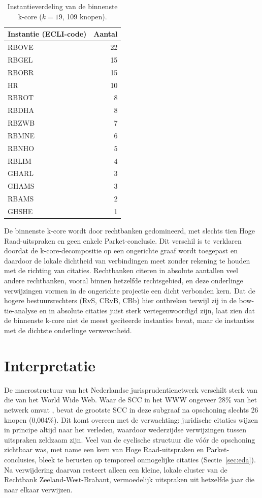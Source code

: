 \documentclass[a4paper, 12pt]{report}
\begin{document}
\begin{table}[H]
  \centering
  \caption{Instantieverdeling van de binnenste k-core ($k=19$, 109 knopen).}
  \label{tab:dv1-kcore-instanties}
  \begin{tabular}{lr}
    \toprule
    Instantie (ECLI-code) & Aantal \\
    \midrule
    RBOVE & 22 \\
    RBGEL & 15 \\
    RBOBR & 15 \\
    HR    & 10 \\
    RBROT & 8 \\
    RBDHA & 8 \\
    RBZWB & 7 \\
    RBMNE & 6 \\
    RBNHO & 5 \\
    RBLIM & 4 \\
    GHARL & 3 \\
    GHAMS & 3 \\
    RBAMS & 2 \\
    GHSHE & 1 \\
    \bottomrule
  \end{tabular}
\end{table}

De binnenste k-core wordt door rechtbanken gedomineerd, met slechts tien Hoge Raad-uitspraken en geen enkele Parket-conclusie. Dit verschil is te verklaren doordat de k-core-decompositie op een ongerichte graaf wordt toegepast en daardoor de lokale dichtheid van verbindingen meet zonder rekening te houden met de richting van citaties. Rechtbanken citeren in absolute aantallen veel andere rechtbanken, vooral binnen hetzelfde rechtsgebied, en deze onderlinge verwijzingen vormen in de ongerichte projectie een dicht verbonden kern. Dat de hogere bestuursrechters (RvS, CRvB, CBb) hier ontbreken terwijl zij in de bow-tie-analyse en in absolute citaties juist sterk vertegenwoordigd zijn, laat zien dat de binnenste k-core niet de meest geciteerde instanties bevat, maar de instanties met de dichtste onderlinge verwevenheid.


\section{Interpretatie}
De macrostructuur van het Nederlandse jurisprudentienetwerk verschilt sterk van die van het World Wide Web. Waar de SCC in het WWW ongeveer 28\% van het netwerk omvat \parencite{broder2000}, bevat de grootste SCC in deze subgraaf na opschoning slechts 26 knopen (0,004\%). Dit komt overeen met de verwachting: juridische citaties wijzen in principe altijd naar het verleden, waardoor wederzijdse verwijzingen tussen uitspraken zeldzaam zijn. Veel van de cyclische structuur die vóór de opschoning zichtbaar was, met name een kern van Hoge Raad-uitspraken en Parket-conclusies, bleek te berusten op temporeel onmogelijke citaties (Sectie~\ref{sec:eda}). Na verwijdering daarvan resteert alleen een kleine, lokale cluster van de Rechtbank Zeeland-West-Brabant, vermoedelijk uitspraken uit hetzelfde jaar die naar elkaar verwijzen.
\end{document}
